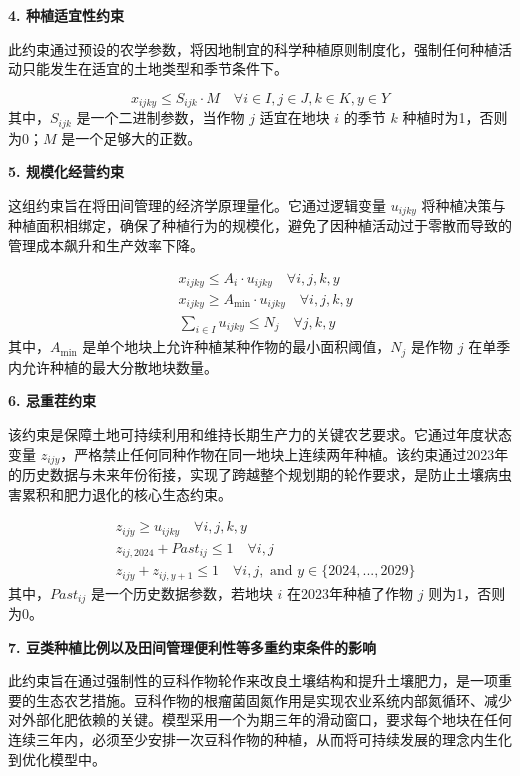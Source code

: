\textbf{4. 种植适宜性约束}

此约束通过预设的农学参数，将因地制宜的科学种植原则制度化，强制任何种植活动只能发生在适宜的土地类型和季节条件下。

\begin{equation}
	x_{ijky} \le S_{ijk} \cdot M \quad \forall i \in I, j \in J, k \in K, y \in Y
\end{equation}
其中，$S_{ijk}$ 是一个二进制参数，当作物 $j$ 适宜在地块 $i$ 的季节 $k$ 种植时为1，否则为0；$M$ 是一个足够大的正数。

\textbf{5. 规模化经营约束}

这组约束旨在将田间管理的经济学原理量化。它通过逻辑变量 $u_{ijky}$ 将种植决策与种植面积相绑定，确保了种植行为的规模化，避免了因种植活动过于零散而导致的管理成本飙升和生产效率下降。

\begin{align}
	 & x_{ijky} \le A_i \cdot u_{ijky} \quad \forall i, j, k, y      \\
	 & x_{ijky} \ge A_{\min} \cdot u_{ijky} \quad \forall i, j, k, y \\
	 & \sum_{i \in I} u_{ijky} \le N_j \quad \forall j, k, y
\end{align}
其中，$A_{\min}$ 是单个地块上允许种植某种作物的最小面积阈值，$N_j$ 是作物 $j$ 在单季内允许种植的最大分散地块数量。

\textbf{6. 忌重茬约束}

该约束是保障土地可持续利用和维持长期生产力的关键农艺要求。它通过年度状态变量 $z_{ijy}$，严格禁止任何同种作物在同一地块上连续两年种植。该约束通过2023年的历史数据与未来年份衔接，实现了跨越整个规划期的轮作要求，是防止土壤病虫害累积和肥力退化的核心生态约束。

\begin{align}
	 & z_{ijy} \ge u_{ijky} \quad \forall i, j, k, y                                       \\
	 & z_{ij,2024} + Past_{ij} \le 1 \quad \forall i, j                                    \\
	 & z_{ijy} + z_{ij,y+1} \le 1 \quad \forall i, j, \text{ and } y \in \{2024,...,2029\}
\end{align}
其中，$Past_{ij}$ 是一个历史数据参数，若地块 $i$ 在2023年种植了作物 $j$ 则为1，否则为0。

\textbf{7. 豆类种植比例以及田间管理便利性等多重约束条件的影响}

此约束旨在通过强制性的豆科作物轮作来改良土壤结构和提升土壤肥力，是一项重要的生态农艺措施。豆科作物的根瘤菌固氮作用是实现农业系统内部氮循环、减少对外部化肥依赖的关键。模型采用一个为期三年的滑动窗口，要求每个地块在任何连续三年内，必须至少安排一次豆科作物的种植，从而将可持续发展的理念内生化到优化模型中。

